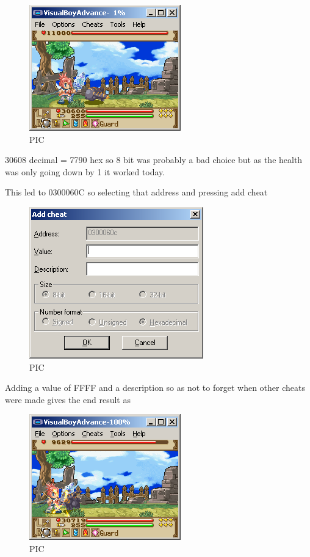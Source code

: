 \documentclass[
]{book}
\begin{document}
\begin{figure}
\centering
\includegraphics{images/206_home_fast6191_romhackingguide_unrenamed_fil___ginal_borders_romhackingguidecheatexample_6.png}
\caption{PIC}
\end{figure}

30608 decimal = 7790 hex so 8 bit was probably a bad choice but as the health was only going down by 1 it worked today.

This led to 0300060C so selecting that address and pressing add cheat

\begin{figure}
\centering
\includegraphics{images/207_home_fast6191_romhackingguide_unrenamed_fil___ginal_borders_romhackingguidecheatexample_7.png}
\caption{PIC}
\end{figure}

Adding a value of FFFF and a description so as not to forget when other cheats were made gives the end result as

\begin{figure}
\centering
\includegraphics{images/208_home_fast6191_romhackingguide_unrenamed_fil___ginal_borders_romhackingguidecheatexample_8.png}
\caption{PIC}
\end{figure}
\end{document}
